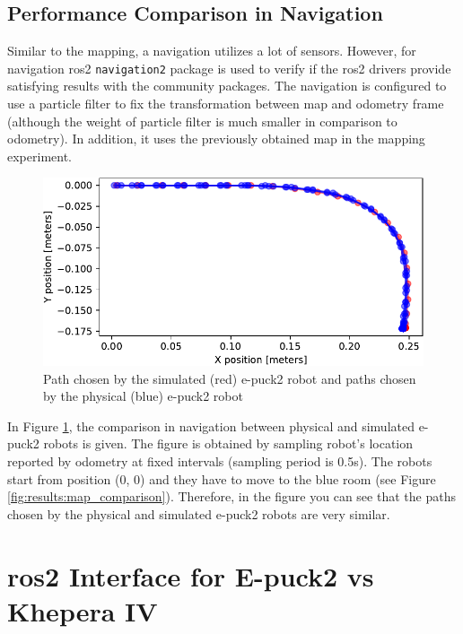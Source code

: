 \subsection{Performance Comparison in Navigation}
\label{results:subsec:phy_navigation}

Similar to the mapping, a navigation utilizes a lot of sensors.
However, for navigation \ac{ros2} \texttt{navigation2} package is used to verify if the \ac{ros2} drivers provide satisfying results with the community packages.
The navigation is configured to use a particle filter to fix the transformation between map and odometry frame (although the weight of particle filter is much smaller in comparison to odometry).
In addition, it uses the previously obtained map in the mapping experiment.

\begin{figure}[H]
    \centering
    \includegraphics[width=\textwidth]{./results/figures/navigation_comparison.pdf}
    \caption{Path chosen by the simulated (red) e-puck2 robot and paths chosen by the physical (blue) e-puck2 robot}
    \label{fig:results:navigation_comparison}
\end{figure}

In Figure \ref{fig:results:navigation_comparison}, the comparison in navigation between physical and simulated e-puck2 robots is given.
The figure is obtained by sampling robot's location reported by odometry at fixed intervals (sampling period is 0.5s).
The robots start from position (0, 0) and they have to move to the blue room (see Figure \ref{fig:results:map_comparison}).
Therefore, in the figure you can see that the paths chosen by the physical and simulated e-puck2 robots are very similar.  

\section{\ac{ros2} Interface for E-puck2 vs Khepera IV}

